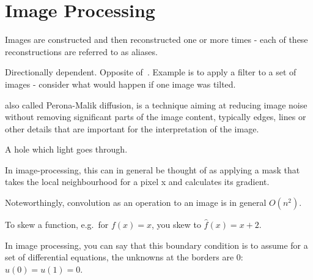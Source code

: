 \section{Image Processing}

\begin{definition}[Aliasing]
    Images are constructed and then reconstructed one or more times - 
    each of these reconstructions are referred to as aliases.
\end{definition}

\begin{definition}[Anisotropy]\label{anisotropy}
    Directionally dependent. Opposite of~.
    Example is to apply a filter to a set of images - consider
    what would happen if one image was tilted.
\end{definition}

\begin{definition}
    also called Perona-Malik diffusion, is a technique aiming at reducing image
    noise without removing significant parts of the image content, typically
    edges, lines or other details that are important for the interpretation of
    the image.

\end{definition}

\begin{definition}[Aperture]
    A hole which light goes through.
\end{definition}

\begin{definition}[Convolution]\label{convolution}
    In image-processing, this can in general be thought of as applying a mask
    that takes the local neighbourhood for a pixel x and calculates its
    gradient.

    Noteworthingly, convolution as an operation to an image is in general
    $O(n^{2})$.
\end{definition}

\begin{definition}
    To skew a function, e.g.\ for $f(x) = x$, you skew to $\hat{f}(x) = x + 2$.
\end{definition}

\begin{definition}
    In image processing, you can say that this boundary condition is to assume
    for a set of differential equations, the unknowns at the borders are 
    0: $u(0) = u(1) = 0$.

\end{definition}

